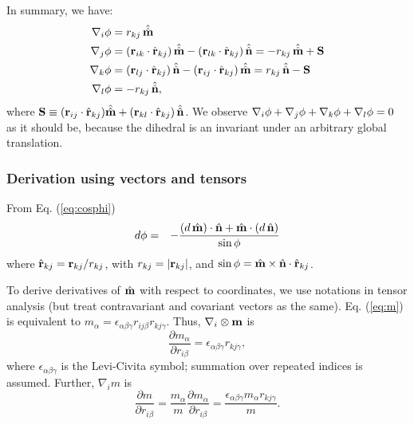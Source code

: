 \documentclass{article}
\begin{document}
In summary, we have:
\begin{equation}
\begin{split}
\nabla_i \phi   &=  r_{kj} \, \hat{\hat{\mathbf{m}}}  \\
\nabla_j \phi   &=  (\mathbf{r}_{ik} \cdot \hat{\mathbf{r}}_{kj}) \, \hat{\hat{\mathbf{m}}} - (\mathbf{r}_{lk} \cdot \hat{\mathbf{r}}_{kj}) \, \hat{\hat{\mathbf{n}}} 
         = -r_{kj} \, \hat{\hat{\mathbf{m}}} + \mathbf{S} \\
\nabla_k \phi   &=  (\mathbf{r}_{lj} \cdot \hat{\mathbf{r}}_{kj}) \, \hat{\hat{\mathbf{n}}} - (\mathbf{r}_{ij} \cdot \hat{\mathbf{r}}_{kj}) \, \hat{\hat{\mathbf{m}}}
         =  r_{kj} \, \hat{\hat{\mathbf{n}}} - \mathbf{S} \\
\nabla_l \phi   &= -r_{kj} \, \hat{\hat{\mathbf{n}}},
\end{split}
\label{eq:gradall}
\end{equation}
where $\mathbf{S} \equiv (\mathbf{r}_{ij}\cdot \hat{\mathbf{r}}_{kj}) \hat{\hat{\mathbf{m}}} + (\mathbf{r}_{kl} \cdot \hat{\mathbf{r}}_{kj}) \, \hat{\hat{\mathbf{n}}}$.
We observe $\nabla_i \phi + \nabla_j \phi + \nabla_k \phi + \nabla_l \phi = 0$ as it should be, 
because the dihedral is an invariant under an arbitrary global translation.




\subsubsection{Derivation using vectors and tensors}

From Eq. (\ref{eq:cosphi})
\begin{eqnarray*}
d \phi  &=&  -\frac{ (d\,\hat{\mathbf{m}}) \cdot \hat{\mathbf{n}} + \hat{\mathbf{m}} \cdot (d\,\hat{\mathbf{n}}) } {\sin \phi} 
\end{eqnarray*}
where 
$\hat{\mathbf{r}}_{kj} = \mathbf{r}_{kj}/r_{kj}$, with $r_{kj} = |\mathbf{r}_{kj}|$,
and 
$\sin\phi = \hat{\mathbf{m}} \times \hat{\mathbf{n}} \cdot \hat{\mathbf{r}}_{kj} $.

To derive derivatives of $\hat{\mathbf{m}}$ with respect to coordinates, 
we use notations in tensor analysis (but treat contravariant and covariant vectors as the same).
Eq. (\ref{eq:m}) is equivalent to
$m_\alpha = \epsilon_{\alpha \beta \gamma} r_{ij \beta} r_{kj \gamma}$.
%
Thus, 
$\nabla_i \otimes \mathbf{m}$
is 
\begin{equation}
  \frac {\partial m_\alpha} {\partial r_{i \beta}} 
  = \epsilon_{\alpha \beta \gamma} r_{k j \gamma},
  \label{eq:dmadrib}
\end{equation}
where $\epsilon_{\alpha \beta \gamma}$ is the Levi-Civita symbol;
%
summation over repeated indices is assumed.
%
Further,
$\nabla_i m$ is 
\begin{equation}
    \frac {\partial m} {\partial r_{i  \beta}} 
  = \frac {m_\alpha}{m} \frac {\partial m_\alpha} {\partial r_{i \beta}} 
  = \frac {\epsilon_{\alpha \beta \gamma} m_\alpha r_{k j \gamma}}{m}.
  \label{eq:dmdrib}
\end{equation}
%
\end{document}
